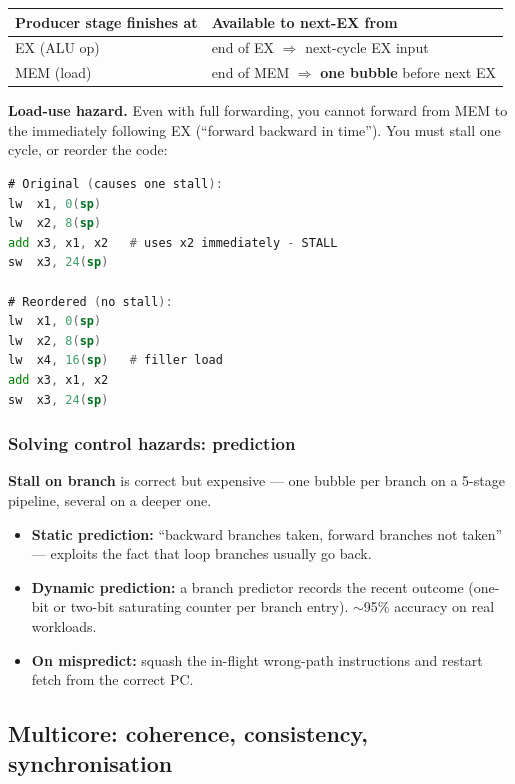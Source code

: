 \documentclass[11pt,a4paper]{article}
\begin{document}
\begin{center}
\begin{tabular}{ll}
\hline
Producer stage finishes at & Available to next-EX from \\
\hline
EX (ALU op)  & end of EX  $\Rightarrow$ next-cycle EX input \\
MEM (load)   & end of MEM $\Rightarrow$ \textbf{one bubble} before next EX \\
\hline
\end{tabular}
\end{center}

\textbf{Load-use hazard.} Even with full forwarding, you cannot forward from MEM to the immediately following EX (``forward backward in time''). You must stall one cycle, or reorder the code:

\begin{lstlisting}[language=asm]
# Original (causes one stall):
lw  x1, 0(sp)
lw  x2, 8(sp)
add x3, x1, x2   # uses x2 immediately - STALL
sw  x3, 24(sp)

# Reordered (no stall):
lw  x1, 0(sp)
lw  x2, 8(sp)
lw  x4, 16(sp)   # filler load
add x3, x1, x2
sw  x3, 24(sp)
\end{lstlisting}

\subsubsection*{Solving control hazards: prediction}

\textbf{Stall on branch} is correct but expensive --- one bubble per branch on a 5-stage pipeline, several on a deeper one.

\begin{itemize}[leftmargin=*,itemsep=1pt]
  \item \textbf{Static prediction:} ``backward branches taken, forward branches not taken'' --- exploits the fact that loop branches usually go back.
  \item \textbf{Dynamic prediction:} a branch predictor records the recent outcome (one-bit or two-bit saturating counter per branch entry). $\sim$95\% accuracy on real workloads.
  \item \textbf{On mispredict:} squash the in-flight wrong-path instructions and restart fetch from the correct PC.
\end{itemize}

\subsection{Multicore: coherence, consistency, synchronisation}
\end{document}
